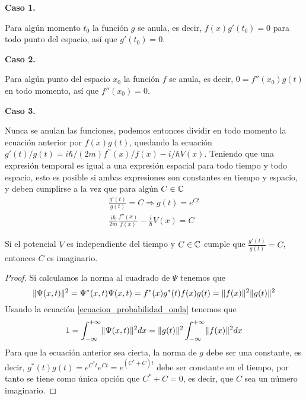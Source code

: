 \textbf{Caso 1.}

Para algún momento $t_0$ la función $g$ se anula, es decir, $f(x)g'(t_0)=0$ para todo punto del espacio, así que $g'(t_0)=0$.

\textbf{Caso 2.}

Para algún punto del espacio $x_0$ la función $f$ se anula, es decir, $0=f''(x_0)g(t)$ en todo momento, así que $f''(x_0)=0$.

\textbf{Caso 3.}

Nunca se anulan las funciones, podemos entonces dividir en todo momento la ecuación anterior por $f(x)g(t)$, quedando la ecuación $g'(t)/g(t)=i\hbar/(2m)f^{\prime\prime}(x)/f(x)-i/\hbar V(x)$. Teniendo que una expresión temporal es igual a una expresión espacial para todo tiempo y todo espacio, esto es posible si ambas expresiones son constantes en tiempo y espacio, y deben cumplirse a la vez que para algún $C\in\mathbb{C}$
\begin{gather*}
    \frac{g'(t)}{g(t)}=C\Rightarrow g(t)=e^{Ct}
    \\
    \frac{i\hbar}{2m}\frac{f''(x)}{f(x)}-\frac{i}{\hbar}V(x)=C
\end{gather*}

\begin{resultado}
    Si el potencial $V$ es independiente del tiempo y $C\in\mathbb{C}$ cumple que $\frac{g'(t)}{g(t)}=C$, entonces $C$ es imaginario.
\end{resultado}
\begin{proof}
    Si calculamos la norma al cuadrado de $\Psi$ tenemos que
    \begin{equation*}
        \lVert\Psi(x,t)\rVert^2=\Psi^*(x,t)\Psi(x,t)=f^*(x)g^*(t)f(x)g(t)=\lVert f(x)\rVert^2\lVert g(t)\rVert^2
    \end{equation*}
    Usando la ecuación \ref{ecuacion_probabilidad_onda} tenemos que
    \begin{equation*}
        1=\int_{-\infty}^{+\infty}\lVert\Psi(x,t)\rVert^2 dx=\lVert g(t)\rVert^2\int_{-\infty}^{+\infty}\lVert f(x)\rVert^2 dx
    \end{equation*}
    Para que la ecuación anterior sea cierta, la norma de $g$ debe ser una constante, es decir, $g^*(t)g(t)=e^{C^*t}e^{Ct}=e^{(C^*+C)t}$ debe ser constante en el tiempo, por tanto se tiene como única opción que $C^*+C=0$, es decir, que $C$ sea un número imaginario.
\end{proof}

